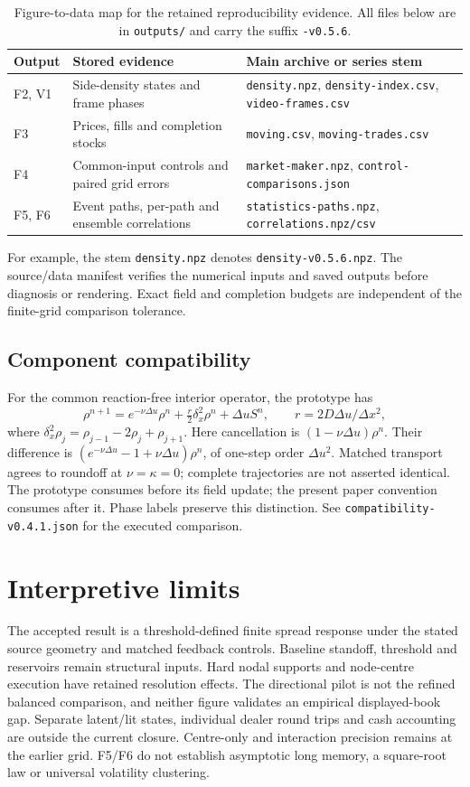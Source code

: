 \documentclass[11pt,a4paper]{article}
\newcommand{\du}{\Delta u}\newcommand{\dx}{\Delta x}\newcommand{\lap}{\delta_x^2}
\begin{document}
\begin{table}[H]\centering\small
\caption{Figure-to-data map for the retained reproducibility evidence. All files below are in \texttt{outputs/} and carry the suffix \texttt{-v0.5.6}.}\label{tab:evidence}
\begin{tabularx}{\textwidth}{@{}lYY@{}}\toprule
Output & Stored evidence & Main archive or series stem\\\midrule
F2, V1 & Side-density states and frame phases & \texttt{density.npz}, \texttt{density-index.csv}, \texttt{video-frames.csv}\\
F3 & Prices, fills and completion stocks & \texttt{moving.csv}, \texttt{moving-trades.csv}\\
F4 & Common-input controls and paired grid errors & \texttt{market-maker.npz}, \texttt{control-comparisons.json}\\
F5, F6 & Event paths, per-path and ensemble correlations & \texttt{statistics-paths.npz}, \texttt{correlations.npz/csv}\\\bottomrule
\end{tabularx}\end{table}
For example, the stem \texttt{density.npz} denotes \texttt{density-v0.5.6.npz}. The source/data manifest verifies the numerical inputs and saved outputs before diagnosis or rendering. Exact field and completion budgets are independent of the finite-grid comparison tolerance.

\subsection{Component compatibility}
For the common reaction-free interior operator, the prototype has
\[
 \rho^{n+1}=e^{-\nu\du}\rho^n+\tfrac r2\lap\rho^n+\du S^n,
 \qquad r=2D\du/\dx^2,
\]
where $\lap\rho_j=\rho_{j-1}-2\rho_j+\rho_{j+1}$. Here cancellation is
$(1-\nu\du)\rho^n$. Their difference is
$(e^{-\nu\du}-1+\nu\du)\rho^n$, of one-step order $\du^2$.
Matched transport agrees to roundoff at $\nu=\kappa=0$; complete trajectories
are not asserted identical. The prototype consumes before its field update;
the present paper convention consumes after it. Phase labels preserve this
distinction. See \texttt{compatibility-v0.4.1.json} for the executed comparison.

\clearpage
\section{Interpretive limits}
The accepted result is a threshold-defined finite spread response under the stated source geometry and matched feedback controls. Baseline standoff, threshold and reservoirs remain structural inputs. Hard nodal supports and node-centre execution have retained resolution effects. The directional pilot is not the refined balanced comparison, and neither figure validates an empirical displayed-book gap. Separate latent/lit states, individual dealer round trips and cash accounting are outside the current closure. Centre-only and interaction precision remains at the earlier grid. F5/F6 do not establish asymptotic long memory, a square-root law or universal volatility clustering.
\end{document}
